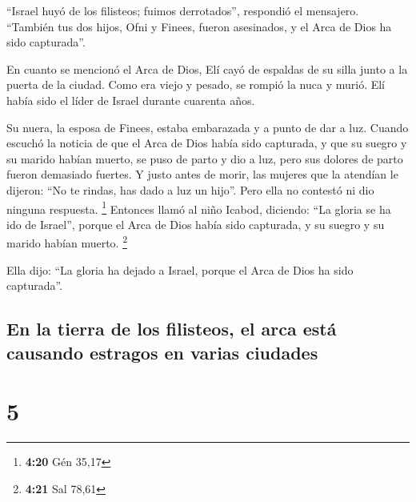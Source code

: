  ``Israel huyó de los filisteos; fuimos derrotados'',
respondió el mensajero. ``También tus dos hijos, Ofni y Finees, fueron
asesinados, y el Arca de Dios ha sido capturada''.

 En cuanto se mencionó el Arca de Dios, Elí cayó de
espaldas de su silla junto a la puerta de la ciudad. Como era viejo y
pesado, se rompió la nuca y murió. Elí había sido el líder de Israel
durante cuarenta años.

 Su nuera, la esposa de Finees, estaba embarazada y a
punto de dar a luz. Cuando escuchó la noticia de que el Arca de Dios
había sido capturada, y que su suegro y su marido habían muerto, se puso
de parto y dio a luz, pero sus dolores de parto fueron demasiado
fuertes.  Y justo antes de morir, las mujeres que la
atendían le dijeron: ``No te rindas, has dado a luz un hijo''. Pero ella
no contestó ni dio ninguna respuesta. \footnote{\textbf{4:20} Gén 35,17}
 Entonces llamó al niño Icabod, diciendo: ``La gloria se
ha ido de Israel'', porque el Arca de Dios había sido capturada, y su
suegro y su marido habían muerto. \footnote{\textbf{4:21} Sal 78,61}

 Ella dijo: ``La gloria ha dejado a Israel, porque el
Arca de Dios ha sido capturada''.

\hypertarget{en-la-tierra-de-los-filisteos-el-arca-estuxe1-causando-estragos-en-varias-ciudades}{%
\subsection{En la tierra de los filisteos, el arca está causando
estragos en varias
ciudades}\label{en-la-tierra-de-los-filisteos-el-arca-estuxe1-causando-estragos-en-varias-ciudades}}

\hypertarget{section-4}{%
\section{5}\label{section-4}}

